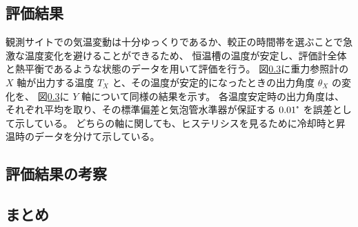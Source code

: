 \documentclass[../../main.tex]{subfiles}
\begin{document}
\subsection{評価結果}
観測サイトでの気温変動は十分ゆっくりであるか、較正の時間帯を選ぶことで急激な温度変化を避けることができるため、
恒温槽の温度が安定し、評価計全体と熱平衡であるような状態のデータを用いて評価を行う。
図\ref{}に重力参照計の $X$ 軸が出力する温度 $T_{X}$ と、その温度が安定的になったときの出力角度 $\theta_{X}$ の変化を、
図\ref{}に $Y$ 軸について同様の結果を示す。
各温度安定時の出力角度は、それぞれ平均を取り、その標準偏差と気泡管水準器が保証する $0.01\tcdegree$ を誤差として示している。
どちらの軸に関しても、ヒステリシスを見るために冷却時と昇温時のデータを分けて示している。

\subsection{評価結果の考察}
\subsection{まとめ}
\end{document}
